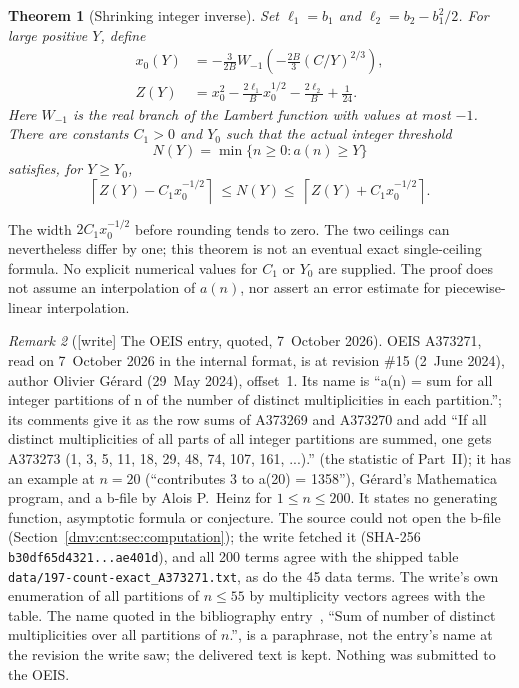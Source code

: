 \documentclass[11pt,letterpaper]{article}
\numberwithin{equation}{section}
\newtheorem{theorem}{Theorem}[section]
\theoremstyle{definition}\newtheorem{definition}[theorem]{Definition}
\theoremstyle{remark}\newtheorem{remark}[theorem]{Remark}
\newcommand{\file}[1]{\nolinkurl{#1}}
\begin{document}
\begin{theorem}[Shrinking integer inverse]\label{dmv:cnt:thm:inverse}
Set $\ell_1=b_1$ and $\ell_2=b_2-b_1^2/2$. For large positive $Y$, define
\begin{align}\label{dmv:cnt:eq:inverse}
x_0(Y)&=-\frac3{2B}W_{-1}\left(-\frac{2B}{3}(C/Y)^{2/3}\right),\\
Z(Y)&=x_0^2-\frac{2\ell_1}{B}x_0^{1/2}-\frac{2\ell_2}{B}+\frac1{24}.
\nonumber
\end{align}
Here $W_{-1}$ is the real branch of the Lambert function with values at most $-1$. There are constants $C_1>0$ and $Y_0$ such that the actual integer threshold
\begin{equation}\label{dmv:cnt:eq:threshold}
N(Y)=\min\{n\ge0:a(n)\ge Y\}
\end{equation}
satisfies, for $Y\ge Y_0$,
\begin{equation}\label{dmv:cnt:eq:ceiling}
\left\lceil Z(Y)-C_1x_0^{-1/2}\right\rceil
\ \le N(Y)\le\
\left\lceil Z(Y)+C_1x_0^{-1/2}\right\rceil.
\end{equation}
\end{theorem}

The width $2C_1x_0^{-1/2}$ before rounding tends to zero. The two ceilings can nevertheless differ by one; this theorem is not an eventual exact single-ceiling formula. No explicit numerical values for $C_1$ or $Y_0$ are supplied. The proof does not assume an interpolation of $a(n)$, nor assert an error estimate for piecewise-linear interpolation.

\begin{remark}[{[write]} The OEIS entry, quoted, 7~October 2026]\label{dmv:cnt:rem:oeis}
OEIS A373271, read on 7~October 2026 in the internal format, is at revision
\#15 (2~June 2024), author Olivier G\'erard (29~May 2024), offset~1. Its name
is ``a(n) = sum for all integer partitions of n of the number of distinct
multiplicities in each partition.''; its comments give it as the row sums of
A373269 and A373270 and add ``If all distinct multiplicities of all parts of
all integer partitions are summed, one gets A373273 (1, 3, 5, 11, 18, 29, 48,
74, 107, 161, ...).'' (the statistic of Part~II); it has an example at
$n=20$ (``contributes 3 to a(20) = 1358''), G\'erard's Mathematica program,
and a b-file by Alois P.~Heinz for $1\le n\le200$. It states no generating
function, asymptotic formula or conjecture. The source could not open the
b-file (Section~\ref{dmv:cnt:sec:computation}); the write fetched it
(SHA-256 \file{b30df65d4321...ae401d}), and all 200 terms agree with the
shipped table \file{data/197-count-exact_A373271.txt}, as do the 45 data
terms. The write's own enumeration of all partitions of $n\le55$ by
multiplicity vectors agrees with the table. The name quoted in the
bibliography entry~\cite{oeisA373271}, ``Sum of number of distinct
multiplicities over all partitions of $n$.'', is a paraphrase, not the
entry's name at the revision the write saw; the delivered text is kept.
Nothing was submitted to the OEIS.
\end{remark}
\end{document}
